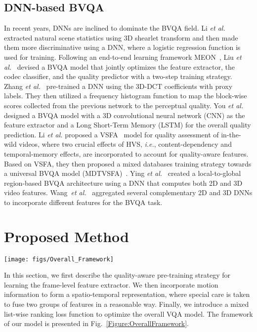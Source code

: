 \documentclass[journal]{IEEEtran}
\begin{document}
\subsection{DNN-based BVQA}\label{subsec:dnn_bvqa}
In recent years, DNNs are inclined to dominate the BVQA field. Li \textit{et al.}~\cite{li2016no} extracted natural scene statistics using 3D shearlet transform and then made them more discriminative using a DNN, where a logistic regression function is used for training. Following an end-to-end learning framework MEON~\cite{Ma2018End}, Liu \textit{et al.}~\cite{liu2018end} devised a BVQA model that jointly optimizes the feature extractor, the codec classifier, and the quality predictor with a two-step training strategy. Zhang \textit{et al.}~\cite{zhang2019blind} pre-trained a DNN using the 3D-DCT coefficients with proxy labels. They then utilized a frequency histogram function to map the block-wise scores collected from the previous network to the perceptual quality. You \textit{et al.}~\cite{you2019deep} designed a BVQA model with a 3D convolutional neural network (CNN) as the feature extractor and a Long Short-Term Memory (LSTM) for the overall quality prediction. Li \textit{et al.} proposed a VSFA~\cite{li2019quality} model for quality assessment of in-the-wild videos, where two crucial effects of HVS, \textit{i.e.}, content-dependency and temporal-memory effects, are incorporated to account for quality-aware features. Based on VSFA, they then proposed a mixed databases training strategy towards a universal BVQA model (MDTVSFA)~\cite{li2021unified}. Ying \textit{et al.}~\cite{ying2021patch} created a local-to-global region-based BVQA architecture using a DNN that computes both 2D and 3D video features. Wang~\textit{et al.}~\cite{wang2021rich} aggregated several complementary 2D and 3D DNNs to incorporate different features for the BVQA task.

\section{Proposed Method}\label{Sec:ProposedMethod}

\begin{figure*}
  \centering
  \captionsetup{justification=centering}
  \texttt{[image: figs/Overall\_Framework]}
  \caption{The overall framework of the proposed VQA model.}\label{Figure:OverallFramework}
\end{figure*}

In this section, we first describe the quality-aware pre-training strategy for learning the frame-level feature extractor. We then incorporate motion information to form a spatio-temporal representation, where special care is taken to fuse two groups of features in a reasonable way. Finally, we introduce a mixed list-wise ranking loss function to optimize the overall VQA model. The framework of our model is presented in Fig.~\ref{Figure:OverallFramework}.
\end{document}
